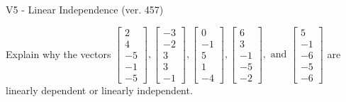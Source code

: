 \begin{exercise}
  \begin{exerciseTitle}V5 - Linear Independence (ver. 457)\end{exerciseTitle}
  \begin{exerciseStatement}
    Explain why the vectors \(\left[\begin{array}{r}
2 \\
4 \\
-5 \\
-1 \\
-5
\end{array}\right] , \left[\begin{array}{r}
-3 \\
-2 \\
3 \\
3 \\
-1
\end{array}\right] , \left[\begin{array}{r}
0 \\
-1 \\
5 \\
1 \\
-4
\end{array}\right] , \left[\begin{array}{r}
6 \\
3 \\
-1 \\
-5 \\
-2
\end{array}\right] , \text{ and } \left[\begin{array}{r}
5 \\
-1 \\
-6 \\
-5 \\
-6
\end{array}\right]\) are linearly dependent or linearly independent.	



\end{exerciseStatement}
\end{exercise}
